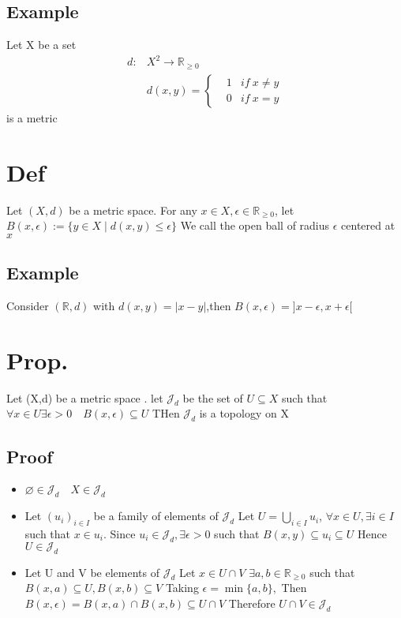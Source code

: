 \documentclass{book}
\begin{document}
\subsection{Example}
Let X be a set$$\begin{aligned}
    d:&X^2\rightarrow\mathbb{R} _{\geq0}\\ & d(x,y)=\left\{\begin{aligned}
    &1 & if\ x\not=y\\
    &0 & if\ x=y
    \end{aligned}\right.
\end{aligned}$$is a metric
\section{Def}
Let $(X,d)$ be a metric space. For any $x\in X,\epsilon \in \mathbb{R} _{\geq0}$, let $B(x,\epsilon):=\{y\in X\mid d(x,y)\leq\epsilon \}$ We call the open ball of radius $\epsilon$ centered at $x$
\subsection{Example}
Consider $(\mathbb{R} ,d)$ with $d(x,y)=\lvert x-y\rvert$,then $B(x,\epsilon)={]x-\epsilon,x+\epsilon[}$
\section{Prop.}
Let (X,d) be a metric space . let $\mathcal{J} _d$ be the set of $U\subseteq X$ such that $\forall x\in U\exists \epsilon >0\quad B(x,\epsilon)\subseteq U$ THen $\mathcal{J} _d$ is a topology on X
\subsection{Proof}
\begin{itemize}
    \item $\varnothing\in \mathcal{J} _d\quad X\in \mathcal{J} _d$
    \item Let $(u_i)_{i\in I}$ be a family of elements of $\mathcal{J} _d$ Let $U=\bigcup\limits_{i\in I}u_i$, $\forall x\in U,\exists i\in I$ such that $x\in u_i$. Since $u_i\in \mathcal{J} _d,\exists \epsilon>0$ such that $B(x,y)\subseteq u_i\subseteq U$ Hence $U\in \mathcal{J} _d$
    \item Let U and V be elements of $\mathcal{J} _d$ Let $x\in U\cap V$ $\exists a,b\in \mathbb{R} _{\geq0}$ such that $B(x,a)\subseteq U, B(x,b)\subseteq V$ Taking $\epsilon=\min\{a,b\},$ Then $B(x,\epsilon)=B(x,a)\cap B(x,b)\subseteq U\cap V$ Therefore $U\cap V\in \mathcal{J} _d$ 
\end{itemize}
\end{document}
